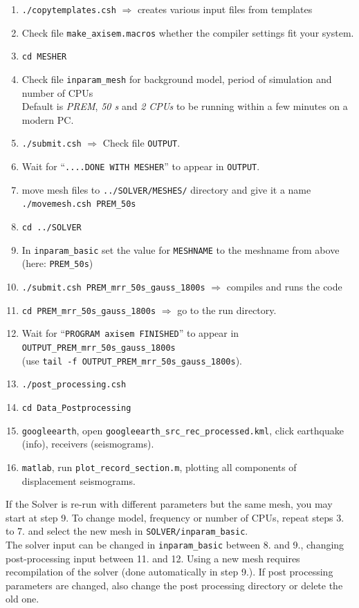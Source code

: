 \documentclass{article}
\begin{document}
\begin{enumerate}
    \item \verb|./copytemplates.csh| $\Rightarrow$ creates various input files from templates
    \item Check file \verb|make_axisem.macros| whether the compiler settings fit your
          system.
    \item \verb|cd MESHER| 
    \item Check file {\tt inparam\_mesh} for background model, period of simulation and
          number of CPUs \\
          Default is \textit{PREM}, \textit{50 s} and \textit{2 CPUs} to be running within a
          few minutes on a modern PC.
    \item \verb|./submit.csh| $\Rightarrow$ Check file {\tt OUTPUT}.
    \item Wait for ``{\tt ....DONE WITH MESHER}'' to appear in {\tt OUTPUT}.
    \item move mesh files to \verb|../SOLVER/MESHES/| directory and give it a name
          \verb|./movemesh.csh PREM_50s| 
    \item \verb|cd ../SOLVER|
    \item In \verb|inparam_basic| set the value for \verb|MESHNAME| to the meshname from
          above (here: \verb|PREM_50s|)
    \item \verb|./submit.csh PREM_mrr_50s_gauss_1800s|  $\Rightarrow$ compiles and runs
          the code
    \item \verb|cd PREM_mrr_50s_gauss_1800s| $\Rightarrow$ go to the run directory.
    \item Wait for ``\verb|PROGRAM axisem FINISHED|'' to appear in
          \verb|OUTPUT_PREM_mrr_50s_gauss_1800s| \\
          (use \verb|tail -f OUTPUT_PREM_mrr_50s_gauss_1800s|).
    \item \verb|./post_processing.csh|
    \item \verb|cd Data_Postprocessing| 
    \item \verb|googleearth|, open {\tt googleearth\_src\_rec\_processed.kml}, click
            earthquake (info), receivers (seismograms).
    \item {\tt matlab}, run {\tt plot\_record\_section.m}, plotting all components
            of displacement seismograms.

\end{enumerate}
If the Solver is re-run with different parameters but the same mesh, you may start at step 9. 
To change model, frequency or number of CPUs, repeat steps 3. to 7. and select the new
mesh in \verb|SOLVER/inparam_basic|. \\
The solver input can be changed in \verb|inparam_basic| between 8. and 9.,
changing post-processing input between 11. and 12. Using a new mesh requires
recompilation of the solver (done automatically in step 9.). If post
processing parameters are changed, also change the post processing directory or
delete the old one.
\end{document}
